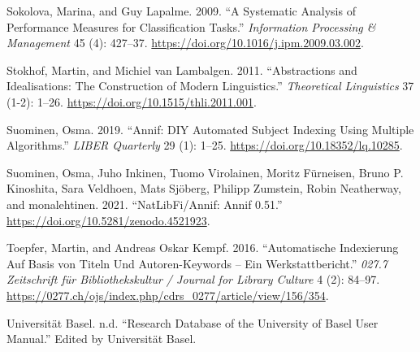 \begin{CSLReferences}{1}{0}
\leavevmode\hypertarget{ref-Sokolova.2009}{}%
Sokolova, Marina, and Guy Lapalme. 2009. {``A Systematic Analysis of
Performance Measures for Classification Tasks.''} \emph{Information
Processing {\&} Management} 45 (4): 427--37.
\url{https://doi.org/10.1016/j.ipm.2009.03.002}.

\leavevmode\hypertarget{ref-Stokhof.2011}{}%
Stokhof, Martin, and Michiel van Lambalgen. 2011. {``Abstractions and
Idealisations: The Construction of Modern Linguistics.''}
\emph{Theoretical Linguistics} 37 (1-2): 1--26.
\url{https://doi.org/10.1515/thli.2011.001}.

\leavevmode\hypertarget{ref-Suominen.2019}{}%
Suominen, Osma. 2019. {``Annif: DIY Automated Subject Indexing Using
Multiple Algorithms.''} \emph{LIBER Quarterly} 29 (1): 1--25.
\url{https://doi.org/10.18352/lq.10285}.

\leavevmode\hypertarget{ref-Suominen.2021}{}%
Suominen, Osma, Juho Inkinen, Tuomo Virolainen, Moritz Fürneisen, Bruno
P. Kinoshita, Sara Veldhoen, Mats Sjöberg, Philipp Zumstein, Robin
Neatherway, and monalehtinen. 2021. {``NatLibFi/Annif: Annif 0.51.''}
\url{https://doi.org/10.5281/zenodo.4521923}.

\leavevmode\hypertarget{ref-Toepfer.2016}{}%
Toepfer, Martin, and Andreas Oskar Kempf. 2016. {``Automatische
Indexierung Auf Basis von Titeln Und Autoren-Keywords -- Ein
Werkstattbericht.''} \emph{027.7 Zeitschrift f{ü}r Bibliothekskultur /
Journal for Library Culture} 4 (2): 84--97.
\url{https://0277.ch/ojs/index.php/cdrs_0277/article/view/156/354}.

\leavevmode\hypertarget{ref-UniversitatBasel.2021}{}%
Universität Basel. n.d. {``Research Database of the University of Basel
User Manual.''} Edited by Universität Basel.

\end{CSLReferences}
